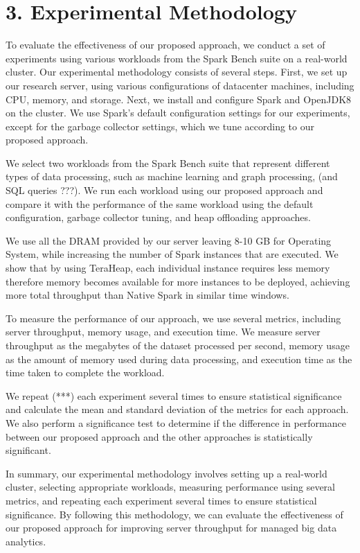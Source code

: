 \documentclass[twocolumn,10pt]{asme2e}
\begin{document}
\section*{3. Experimental Methodology}

To evaluate the effectiveness of our proposed approach, we conduct a set of experiments using various workloads from the Spark Bench suite on a real-world cluster. Our experimental methodology consists of several steps. First, we set up our research server, using various configurations of datacenter machines, including CPU, memory, and storage. Next, we install and configure Spark and OpenJDK8 on the cluster. We use Spark's default configuration settings for our experiments, except for the garbage collector settings, which we tune according to our proposed approach.

We select two workloads from the Spark Bench suite that represent different types of data processing, such as machine learning and graph processing, (and SQL queries ???). We run each workload using our proposed approach and compare it with the performance of the same workload using the default configuration, garbage collector tuning, and heap offloading approaches.

We use all the DRAM provided by our server leaving 8-10 GB for Operating System, while increasing the number of Spark instances that are executed. We show that by using TeraHeap, each individual instance requires less memory therefore memory becomes available for more instances to be deployed, achieving more total throughput than Native Spark in similar time windows.

To measure the performance of our approach, we use several metrics, including server throughput, memory usage, and execution time. We measure server throughput as the megabytes of the dataset processed per second, memory usage as the amount of memory used during data processing, and execution time as the time taken to complete the workload.

We repeat (***) each experiment several times to ensure statistical significance and calculate the mean and standard deviation of the metrics for each approach. We also perform a significance test to determine if the difference in performance between our proposed approach and the other approaches is statistically significant.

In summary, our experimental methodology involves setting up a real-world cluster, selecting appropriate workloads, measuring performance using several metrics, and repeating each experiment several times to ensure statistical significance. By following this methodology, we can evaluate the effectiveness of our proposed approach for improving server throughput for managed big data analytics.
\end{document}

